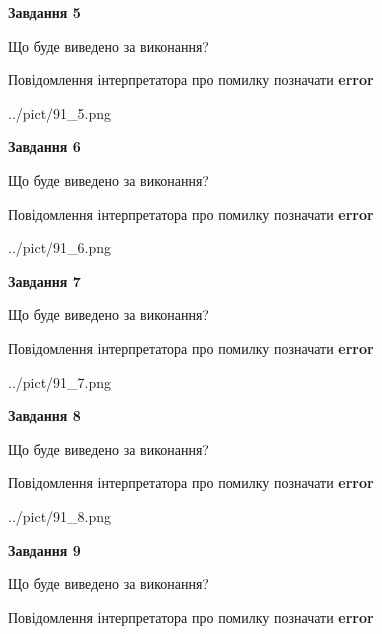 \documentclass[11pt, ukrainian]{article}
\begin{document}
{\begin {large}
{\begin {center}\textbf{Завдання 5}\end {center}}\par
Що буде виведено за виконання? \par
Повідомлення інтерпретатора про помилку позначати \textbf{error}

\begin{center}
	{../pict/91_5.png}
\end{center}
\newpage

{\begin {center}\textbf{Завдання 6}\end {center}}\par
Що буде виведено за виконання? \par
Повідомлення інтерпретатора про помилку позначати \textbf{error}

\begin{center}
	{../pict/91_6.png}
\end{center}
\newpage

{\begin {center}\textbf{Завдання 7}\end {center}}\par
Що буде виведено за виконання? \par
Повідомлення інтерпретатора про помилку позначати \textbf{error}

\begin{center}
	{../pict/91_7.png}
\end{center}
\newpage

{\begin {center}\textbf{Завдання 8}\end {center}}\par
Що буде виведено за виконання? \par
Повідомлення інтерпретатора про помилку позначати \textbf{error}

\begin{center}
	{../pict/91_8.png}
\end{center}
\newpage

{\begin {center}\textbf{Завдання 9}\end {center}}\par
Що буде виведено за виконання? \par
Повідомлення інтерпретатора про помилку позначати \textbf{error}


\end{large}}
\end{document}
